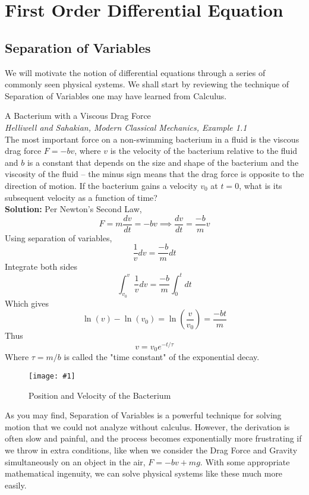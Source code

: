 \documentclass[11pt]{article}
\newcommand{\fig}[4]{
    \begin{figure}[H]
        \centering
        \texttt{[image: \#1]}
        \caption{#2}
        \label{exp4fit}
    \end{figure}
}
\theoremstyle{gangnamstyle}{\newtheorem{definition}{Definition}[]}
\theoremstyle{gangnamstyle}{\newtheorem{example}{Example}[]}
\theoremstyle{gangnamstyle}{\newtheorem{problem}{Problem}[]}
\theoremstyle{gangnamstyle}{\newtheorem{warning}{Warning}[]}
\begin{document}

\section{First Order Differential Equation}
\subsection{Separation of Variables}

We will motivate the notion of differential equations through a series of commonly seen physical systems. We shall start by reviewing the technique of Separation of Variables one may have learned from Calculus. 

\begin{example}
A Bacterium with a Viscous Drag Force \\
\textit{Helliwell and Sahakian, Modern Classical Mechanics, Example 1.1} \\
The most important force on a non-swimming bacterium in a fluid is the viscous drag force $F = -bv$, where $v$ is the velocity of the bacterium relative to the fluid and $b$ is a constant that depends on the size and shape of the bacterium and the viscosity of the fluid – the minus sign means that the drag force is opposite to the direction of motion. If the bacterium gains a velocity $v_0$ at $t = 0$, what is its subsequent velocity as a function of time? \\

\textbf{Solution:} Per Newton's Second Law, 
\[ F = m\frac{dv}{dt} = -bv \implies \frac{dv}{dt} = \frac{-b}{m}v \]
Using separation of variables,
\[ \frac{1}{v}dv = \frac{-b}{m}dt \]
Integrate both sides
\[ \int_{v_0}^v \frac{1}{v}dv = \frac{-b}{m} \int_0^t dt \]
Which gives
\[ \ln(v) - \ln(v_0) = \ln(\frac{v}{v_0}) = \frac{-bt}{m} \]
Thus
\[ v = v_0e^{-t / \tau} \]
Where $\tau = m/b$ is called the "time constant" of the exponential decay. 

\fig{figs/n1/exp.jpg}{Position and Velocity of the Bacterium}{0.4}{0}
\end{example}

As you may find, Separation of Variables is a powerful technique for solving motion that we could not analyze without calculus. However, the derivation is often slow and painful, and the process becomes exponentially more frustrating if we throw in extra conditions, like when we consider the Drag Force and Gravity simultaneously on an object in the air, $F = -bv + mg$. With some appropriate mathematical ingenuity, we can solve physical systems like these much more easily. 
\end{document}

